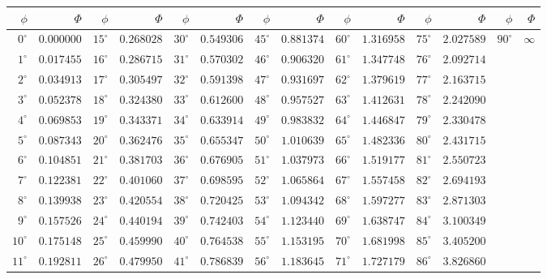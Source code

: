 \documentclass[11pt,a4paper]{book}
\begin{document}
\begin{center}
\small
\begin{tabular}{r|r|r|r|r|r|r|r|r|r|r|r|r|r}
\hline
$\phi$ & $\Phi$ & $\phi$ & $\Phi$ & $\phi$ & $\Phi$ & $\phi$ & $\Phi$ & $\phi$ & $\Phi$ & $\phi$ & $\Phi$ & $\phi$ & $\Phi$ \\
\hline
$0^\circ$ & $0.000000$ & $15^\circ$ & $0.268028$ & $30^\circ$ & $0.549306$ & $45^\circ$ & $0.881374$ & $60^\circ$ & $1.316958$ & $75^\circ$ & $2.027589$ & $90^\circ$ & $\infty$ \\
$1^\circ$ & $0.017455$ & $16^\circ$ & $0.286715$ & $31^\circ$ & $0.570302$ & $46^\circ$ & $0.906320$ & $61^\circ$ & $1.347748$ & $76^\circ$ & $2.092714$ & & \\
$2^\circ$ & $0.034913$ & $17^\circ$ & $0.305497$ & $32^\circ$ & $0.591398$ & $47^\circ$ & $0.931697$ & $62^\circ$ & $1.379619$ & $77^\circ$ & $2.163715$ & & \\
$3^\circ$ & $0.052378$ & $18^\circ$ & $0.324380$ & $33^\circ$ & $0.612600$ & $48^\circ$ & $0.957527$ & $63^\circ$ & $1.412631$ & $78^\circ$ & $2.242090$ & & \\
$4^\circ$ & $0.069853$ & $19^\circ$ & $0.343371$ & $34^\circ$ & $0.633914$ & $49^\circ$ & $0.983832$ & $64^\circ$ & $1.446847$ & $79^\circ$ & $2.330478$ & & \\
$5^\circ$ & $0.087343$ & $20^\circ$ & $0.362476$ & $35^\circ$ & $0.655347$ & $50^\circ$ & $1.010639$ & $65^\circ$ & $1.482336$ & $80^\circ$ & $2.431715$ & & \\
$6^\circ$ & $0.104851$ & $21^\circ$ & $0.381703$ & $36^\circ$ & $0.676905$ & $51^\circ$ & $1.037973$ & $66^\circ$ & $1.519177$ & $81^\circ$ & $2.550723$ & & \\
$7^\circ$ & $0.122381$ & $22^\circ$ & $0.401060$ & $37^\circ$ & $0.698595$ & $52^\circ$ & $1.065864$ & $67^\circ$ & $1.557458$ & $82^\circ$ & $2.694193$ & & \\
$8^\circ$ & $0.139938$ & $23^\circ$ & $0.420554$ & $38^\circ$ & $0.720425$ & $53^\circ$ & $1.094342$ & $68^\circ$ & $1.597277$ & $83^\circ$ & $2.871303$ & & \\
$9^\circ$ & $0.157526$ & $24^\circ$ & $0.440194$ & $39^\circ$ & $0.742403$ & $54^\circ$ & $1.123440$ & $69^\circ$ & $1.638747$ & $84^\circ$ & $3.100349$ & & \\
$10^\circ$ & $0.175148$ & $25^\circ$ & $0.459990$ & $40^\circ$ & $0.764538$ & $55^\circ$ & $1.153195$ & $70^\circ$ & $1.681998$ & $85^\circ$ & $3.405200$ & & \\
$11^\circ$ & $0.192811$ & $26^\circ$ & $0.479950$ & $41^\circ$ & $0.786839$ & $56^\circ$ & $1.183645$ & $71^\circ$ & $1.727179$ & $86^\circ$ & $3.826860$ & & \\

\end{tabular}
\end{center}
\end{document}
